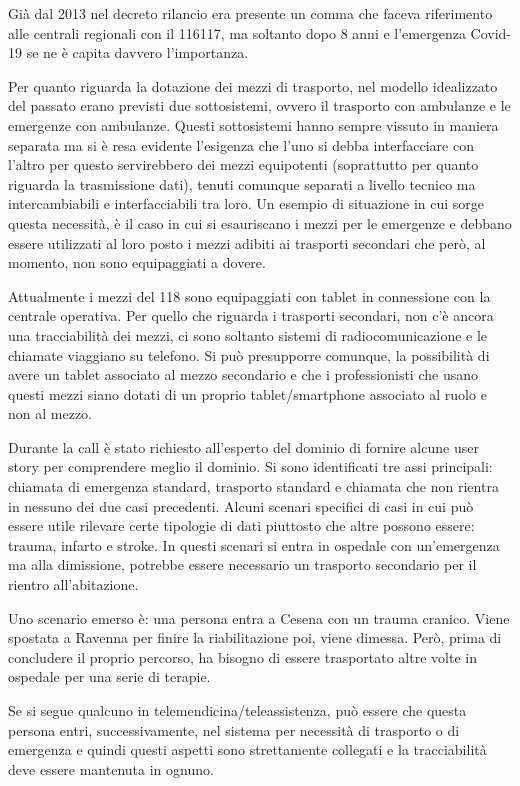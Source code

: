 \documentclass[12pt]{article}
\begin{document}
Già dal 2013 nel decreto rilancio era presente un comma che faceva riferimento alle centrali regionali con il 116117, ma soltanto dopo 8 anni e l'emergenza Covid-19 se ne è capita davvero l'importanza.
\hfill \break

Per quanto riguarda la dotazione dei mezzi di trasporto, nel modello idealizzato del passato erano previsti due sottosistemi, ovvero il trasporto con ambulanze e le emergenze con ambulanze. Questi sottosistemi hanno sempre vissuto in maniera separata ma si è resa evidente l'esigenza che l'uno si debba interfacciare con l'altro per questo servirebbero dei mezzi equipotenti (soprattutto per quanto riguarda la trasmissione dati), tenuti comunque separati a livello tecnico ma intercambiabili e interfacciabili tra loro.
Un esempio di situazione in cui sorge questa necessità, è il caso in cui si esauriscano i mezzi per le emergenze e debbano essere utilizzati al loro posto i mezzi adibiti ai trasporti secondari che però, al momento, non sono equipaggiati a dovere.

Attualmente i mezzi del 118 sono equipaggiati con tablet in connessione con la centrale operativa. Per quello che riguarda i trasporti secondari, non c'è ancora una tracciabilità dei mezzi, ci sono soltanto sistemi di radiocomunicazione e le chiamate viaggiano su telefono. Si può presupporre comunque, la possibilità di avere un tablet associato al mezzo secondario e che i professionisti che usano questi mezzi siano dotati di un proprio tablet/smartphone associato al ruolo e non al mezzo.
\hfill \break

Durante la call è stato richiesto all'esperto del dominio di fornire alcune user story per comprendere meglio il dominio. Si sono identificati tre assi principali: chiamata di emergenza standard, trasporto standard e chiamata che non rientra in nessuno dei due casi precedenti.
Alcuni scenari specifici di casi in cui può essere utile rilevare certe tipologie di dati piuttosto che altre possono essere: trauma, infarto e stroke. In questi scenari si entra in ospedale con un'emergenza ma alla dimissione, potrebbe essere necessario un trasporto secondario per il rientro all'abitazione.

Uno scenario emerso è: una persona entra a Cesena con un trauma cranico. Viene spostata a Ravenna per finire la riabilitazione poi, viene dimessa. Però, prima di concludere il proprio percorso, ha bisogno di essere trasportato altre volte in ospedale per una serie di terapie.

Se si segue qualcuno in telemendicina/teleassistenza, può essere che questa persona entri, successivamente, nel sistema per necessità di trasporto o di emergenza e quindi questi aspetti sono strettamente collegati e la tracciabilità deve essere mantenuta in ognuno.
\end{document}
